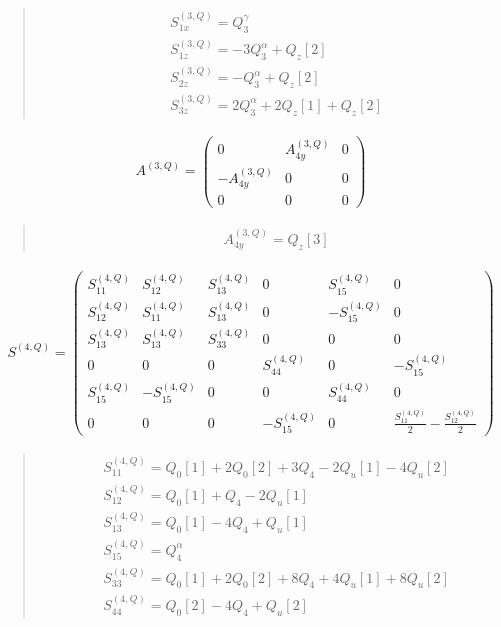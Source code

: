 \documentclass[fleqn,10pt]{jsarticle}
\begin{document}
\begin{quote}
\begin{align*}
& S^{(3,Q)}_{1x} = Q_{3}^{\gamma} \\
& S^{(3,Q)}_{1z} = - 3 Q_{3}^{\alpha} + Q_{z}[2] \\
& S^{(3,Q)}_{2z} = - Q_{3}^{\alpha} + Q_{z}[2] \\
& S^{(3,Q)}_{3z} = 2 Q_{3}^{\alpha} + 2 Q_{z}[1] + Q_{z}[2]
\end{align*}
\end{quote}
\begin{align*}
A^{(3,Q)} = \begin{pmatrix} 0 & A^{(3,Q)}_{4y} & 0 \\ - A^{(3,Q)}_{4y} & 0 & 0 \\ 0 & 0 & 0 \end{pmatrix}
\end{align*}
\begin{quote}
\begin{align*}
& A^{(3,Q)}_{4y} = Q_{z}[3]
\end{align*}
\end{quote}
\begin{align*}
S^{(4,Q)} = \begin{pmatrix} S^{(4,Q)}_{11} & S^{(4,Q)}_{12} & S^{(4,Q)}_{13} & 0 & S^{(4,Q)}_{15} & 0 \\ S^{(4,Q)}_{12} & S^{(4,Q)}_{11} & S^{(4,Q)}_{13} & 0 & - S^{(4,Q)}_{15} & 0 \\ S^{(4,Q)}_{13} & S^{(4,Q)}_{13} & S^{(4,Q)}_{33} & 0 & 0 & 0 \\ 0 & 0 & 0 & S^{(4,Q)}_{44} & 0 & - S^{(4,Q)}_{15} \\ S^{(4,Q)}_{15} & - S^{(4,Q)}_{15} & 0 & 0 & S^{(4,Q)}_{44} & 0 \\ 0 & 0 & 0 & - S^{(4,Q)}_{15} & 0 & \frac{S^{(4,Q)}_{11}}{2} - \frac{S^{(4,Q)}_{12}}{2} \end{pmatrix}
\end{align*}
\begin{quote}
\begin{align*}
& S^{(4,Q)}_{11} = Q_{0}[1] + 2 Q_{0}[2] + 3 Q_{4} - 2 Q_{u}[1] - 4 Q_{u}[2] \\
& S^{(4,Q)}_{12} = Q_{0}[1] + Q_{4} - 2 Q_{u}[1] \\
& S^{(4,Q)}_{13} = Q_{0}[1] - 4 Q_{4} + Q_{u}[1] \\
& S^{(4,Q)}_{15} = Q_{4}^{\alpha} \\
& S^{(4,Q)}_{33} = Q_{0}[1] + 2 Q_{0}[2] + 8 Q_{4} + 4 Q_{u}[1] + 8 Q_{u}[2] \\
& S^{(4,Q)}_{44} = Q_{0}[2] - 4 Q_{4} + Q_{u}[2]
\end{align*}
\end{quote}
\end{document}
